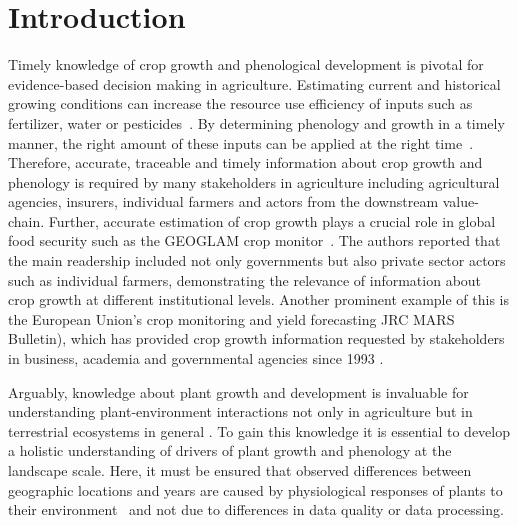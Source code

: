 \section{Introduction}
\label{sec:insights_introduction}
Timely knowledge of crop growth and phenological development is pivotal for evidence-based decision making in agriculture. Estimating current and historical growing conditions can increase the resource use efficiency of inputs such as fertilizer, water or pesticides~\citep{bach_sustainable_2018}. By determining phenology and growth in a timely manner, the right amount of these inputs can be applied at the right time~\citep{pedersen_precision_2017,argento_site-specific_2021}. Therefore, accurate, traceable and timely information about crop growth and phenology is required by many stakeholders in agriculture including agricultural agencies, insurers, individual farmers and actors from the downstream value-chain. Further, accurate estimation of crop growth plays a crucial role in global food security such as the GEOGLAM crop monitor~\citep{becker-reshef_strengthening_2020}. The authors reported that the main readership included not only governments but also private sector actors such as individual farmers, demonstrating the relevance of information about crop growth at different institutional levels. Another prominent example of this is the European Union's crop monitoring and yield forecasting JRC MARS Bulletin), which has provided crop growth information requested by stakeholders in business, academia and governmental agencies since 1993 \citep{van_der_velde_use_2019}.

Arguably, knowledge about plant growth and development is invaluable for understanding plant-environment interactions not only in agriculture but in terrestrial ecosystems in general \citep{zhu_greening_2016}.
To gain this knowledge it is essential to develop a holistic understanding of drivers of plant growth and phenology at the landscape scale. Here, it must be ensured that observed differences between geographic locations and years are caused by physiological responses of plants to their environment~\citep{korner_tools_2021} and not due to differences in data quality or data processing.

